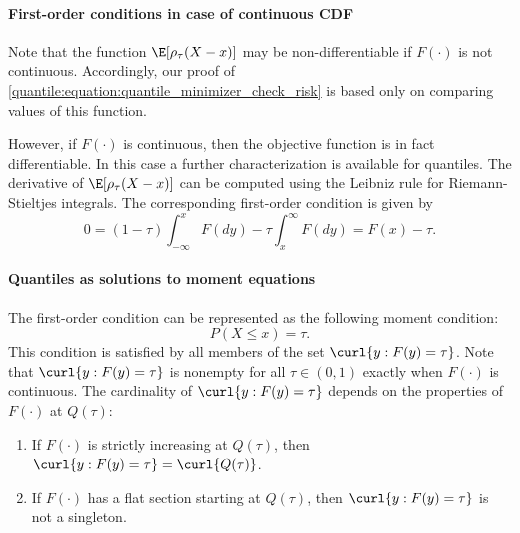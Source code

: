  \paragraph{First-order conditions in case of continuous CDF}

Note that the function $\E[\rho_{\tau}(X-x)]$ may  be non-differentiable if $F(\cdot)$ is not continuous. 
%
Accordingly, our proof of \eqref{quantile:equation:quantile_minimizer_check_risk} is based only on comparing values of this function.

However, if $F(\cdot)$ is continuous, then the objective function is in fact differentiable. In this case a further characterization is available for quantiles.
%
The derivative of $\E[\rho_{\tau}(X-x)]$ can be computed using the Leibniz rule for Riemann-Stieltjes integrals.
%
The corresponding first-order condition is given by
\begin{equation}
	0= (1-\tau)\int_{-\infty}^{x} F(dy)- \tau\int_{x}^{\infty} F(dy) = F(x)-\tau.
\end{equation}

\paragraph{Quantiles as solutions to moment equations}

The first-order condition can be represented as  the following moment condition:
 \begin{equation}\label{quantile:equation:quantile_moment}
	P\left( X\leq x \right) = \tau.
\end{equation}
%
This condition is satisfied by all members of the set $\curl{y: F(y)=\tau}$.
%
Note that $\curl{y: F(y)=\tau}$ is nonempty for all $\tau\in(0, 1)$ exactly when $F(\cdot)$ is continuous.
%
The cardinality of $\curl{y: F(y)=\tau}$ depends on the properties of $F(\cdot)$ at $Q(\tau)$:
\begin{enumerate}
	\item If $F(\cdot)$   is strictly increasing at $Q(\tau)$, then 
	$\curl{y: F(y)=\tau}  = \curl{Q(\tau)}$.
	\item If $F(\cdot)$ has a flat section starting at  $Q(\tau)$, then $\curl{y: F(y)=\tau}$ is not a singleton.  
\end{enumerate}
 
